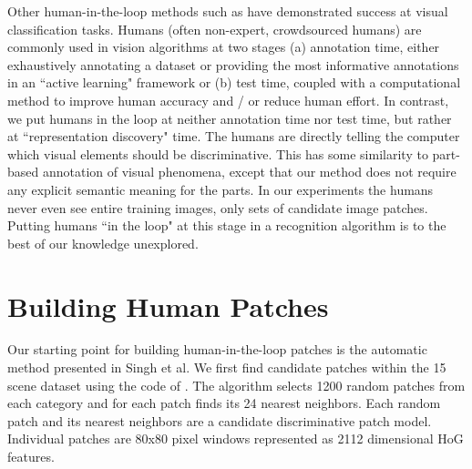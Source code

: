 \documentclass[10pt,twocolumn,letterpaper]{article}
\begin{document}
Other human-in-the-loop methods such as \cite{gingold2012micro, branson2010visual, kovashka2012whittlesearch} have demonstrated success at visual classification tasks. Humans (often non-expert, crowdsourced humans) are commonly used in vision algorithms at two stages (a) annotation time, either exhaustively annotating a dataset or providing the most informative annotations in an ``active learning" framework or (b) test time, coupled with a computational method to improve human accuracy and / or reduce human effort. In contrast, we put humans in the loop at neither annotation time nor test time, but rather at ``representation discovery" time. The humans are directly telling the computer which visual elements should be discriminative. This has some similarity to part-based annotation of visual phenomena, except that our method does not require any explicit semantic meaning for the parts. In our experiments the humans never even see entire training images, only sets of candidate image patches. Putting humans ``in the loop" at this stage in a recognition algorithm is to the best of our knowledge unexplored.

\section{Building Human Patches}
%
%

Our starting point for building human-in-the-loop patches is the automatic method presented in Singh et al. We first find candidate patches within the 15 scene dataset \cite{lazebnik2006beyond} using the code of \cite{singh2012unsupervised, doersch2012makes}. The algorithm selects 1200 random patches from each category and for each patch finds its 24 nearest neighbors. Each random patch and its nearest neighbors are a candidate discriminative patch model. Individual patches are 80x80 pixel windows represented as 2112 dimensional HoG features.
\end{document}
